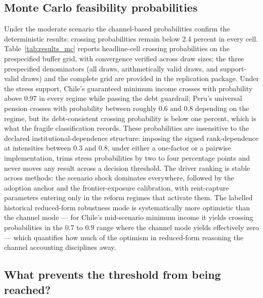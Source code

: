 \documentclass[11pt,a4paper]{article}
\begin{document}
\subsection{Monte Carlo feasibility probabilities}\label{subsec:results_mc}

Under the moderate scenario the channel-based probabilities confirm the deterministic results: crossing
probabilities remain below 2.4 percent in every cell. Table~\ref{tab:results_mc} reports headline-cell crossing probabilities on the
prespecified buffer grid, with convergence verified across draw sizes; the three prespecified
denominators (all draws, arithmetically valid draws, and support-valid draws) and the complete
grid are provided in the replication package. Under the stress support, Chile's guaranteed minimum income crosses with
probability above $0.97$ in every regime while passing the debt guardrail; Peru's universal
pension crosses with probability between roughly $0.6$ and $0.8$ depending on the regime,
but its debt-consistent crossing probability is below one percent, which is what the
fragile classification records. These probabilities are insensitive to the declared institutional-dependence structure:
imposing the signed rank-dependence at intensities between $0.3$ and $0.8$, under either a
one-factor or a pairwise implementation, trims stress probabilities by two to four
percentage points and never moves any result across a decision threshold. The
driver ranking is stable across methods: the scenario shock dominates everywhere, followed
by the adoption anchor and the frontier-exposure calibration, with rent-capture parameters
entering only in the reform regimes that activate them. The labelled historical
reduced-form robustness mode is systematically more optimistic than the channel mode ---
for Chile's mid-scenario minimum income it yields crossing probabilities in the $0.7$ to
$0.9$ range where the channel mode yields effectively zero --- which quantifies how much of
the optimism in reduced-form reasoning the channel accounting disciplines away.


\subsection{What prevents the threshold from being reached?}\label{subsec:results_inversions}
\end{document}

